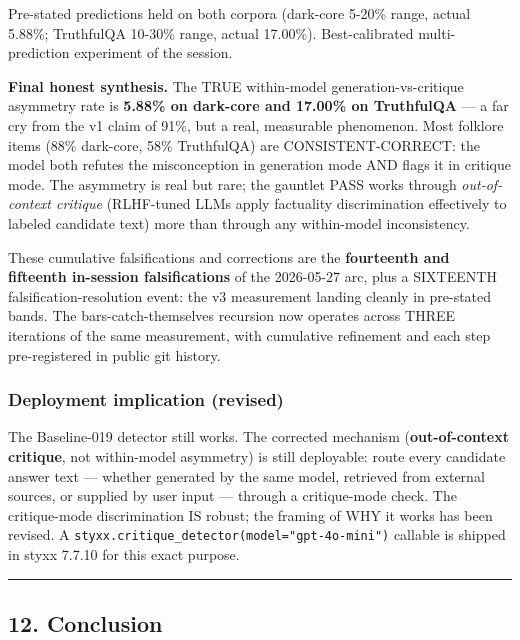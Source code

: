 \documentclass[
]{article}
\begin{document}
Pre-stated predictions held on both corpora (dark-core 5-20\% range,
actual 5.88\%; TruthfulQA 10-30\% range, actual 17.00\%).
Best-calibrated multi-prediction experiment of the session.

\textbf{Final honest synthesis.} The TRUE within-model
generation-vs-critique asymmetry rate is \textbf{5.88\% on dark-core and
17.00\% on TruthfulQA} --- a far cry from the v1 claim of 91\%, but a
real, measurable phenomenon. Most folklore items (88\% dark-core, 58\%
TruthfulQA) are CONSISTENT-CORRECT: the model both refutes the
misconception in generation mode AND flags it in critique mode. The
asymmetry is real but rare; the gauntlet PASS works through
\emph{out-of-context critique} (RLHF-tuned LLMs apply factuality
discrimination effectively to labeled candidate text) more than through
any within-model inconsistency.

These cumulative falsifications and corrections are the
\textbf{fourteenth and fifteenth in-session falsifications} of the
2026-05-27 arc, plus a SIXTEENTH falsification-resolution event: the v3
measurement landing cleanly in pre-stated bands. The
bars-catch-themselves recursion now operates across THREE iterations of
the same measurement, with cumulative refinement and each step
pre-registered in public git history.

\subsubsection{Deployment implication
(revised)}\label{deployment-implication-revised}

The Baseline-019 detector still works. The corrected mechanism
(\textbf{out-of-context critique}, not within-model asymmetry) is still
deployable: route every candidate answer text --- whether generated by
the same model, retrieved from external sources, or supplied by user
input --- through a critique-mode check. The critique-mode
discrimination IS robust; the framing of WHY it works has been revised.
A \texttt{styxx.critique\_detector(model="gpt-4o-mini")} callable is
shipped in styxx 7.7.10 for this exact purpose.

\begin{center}\rule{0.5\linewidth}{0.5pt}\end{center}

\subsection{12. Conclusion}\label{conclusion}
\end{document}

